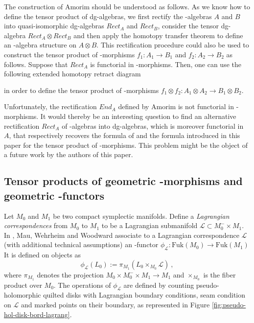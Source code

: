 \documentclass[twoside, 12pt]{amsart}
\theoremstyle{remark}
\begin{document}
The construction of Amorim should be understood as follows. As we know how to define the tensor product of dg-algebras, we first rectify the \Ainf -algebras $A$ and $B$ into quasi-isomorphic dg-algebras $Rect_A$ and $Rect_B$, consider the tensor dg-algebra $Rect_A \otimes Rect_B$ and then apply the homotopy transfer theorem to define an \Ainf -algebra structure on $A \otimes B$. This rectification procedure could also be used to construct the tensor product of \Ainf -morphisms $f_1 : A_1 \rightarrow B_1$ and $f_2 : A_2 \rightarrow B_2$ as follows. Suppose that $Rect_A$ is functorial in \Ainf -morphisms. Then, one can use the following extended homotopy retract diagram
\begin{center} 
\end{center}
in order to define the tensor product of \Ainf -morphisms $f_1 \otimes f_2 : A_1 \otimes A_2 \rightarrow B_1 \otimes B_2$.

Unfortunately, the rectification $End_A$ defined by Amorim is not functorial in \Ainf -morphisms. It would thereby be an interesting question to find an alternative rectification $Rect_A$ of \Ainf -algebras into dg-algebras, which is moreover functorial in $A$, that respectively recovers the formula of \cite{MarklShnider06,MTTV19} and the formula introduced in this paper for the tensor product of \Ainf -morphisms. This problem might be the object of a future work by the authors of this paper.

\subsection{Tensor products of geometric \Ainf -morphisms and geometric \Ainf -functors}

Let $M_0$ and $M_1$ be two compact symplectic manifolds. Define a \emph{Lagrangian correspondences} from $M_0$ to $M_1$ to be a Lagrangian submanifold $\mathcal{L} \subset M_0^{-} \times M_1$.
In \cite{mau-wehrheim-woodward}, Mau, Wehrheim and Woodward associate to a Lagrangian correspondence $\mathcal{L}$ (with additional technical assumptions) an \Ainf -functor $\phi_{\mathcal{L}} : \mathrm{Fuk}(M_0) \rightarrow \mathrm{Fuk}(M_1)$  It is defined on objects as 
\[ \phi_{\mathcal{L}} (L_0) := \pi_{M_1} ( L_0 \times_{M_0} \mathcal{L} ) \ , \]
where $\pi_{M_1}$ denotes the projection $M_0 \times M_0^{-} \times M_1 \rightarrow M_1$ and $\times_{M_0}$ is the fiber product over $M_0$. The operations of $\phi_{\mathcal{L}}$ are defined by counting pseudo-holomorphic quilted disks with Lagrangian boundary conditions, seam condition on $\mathcal{L}$ and marked points on their boundary, as represented in Figure \ref{fig:pseudo-hol-disk-bord-lagrang}. 
\end{document}

